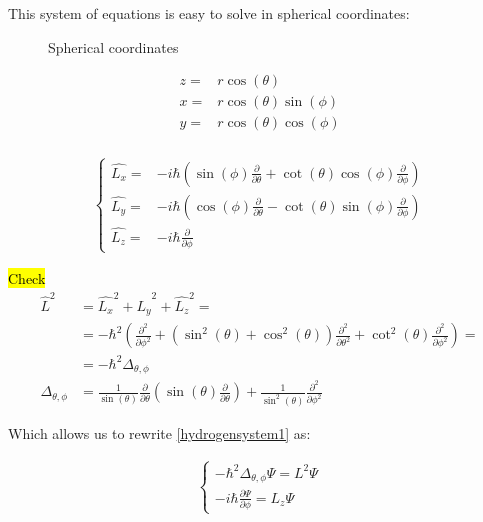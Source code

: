 			This system of equations is easy to solve in spherical coordinates:
			\begin{figure}[!h]
				\centering
				
				\caption{Spherical coordinates}
			\end{figure}
			
			\begin{align}
				z =& r \cos(\theta) \\ 
				x =& r \cos(\theta)\sin(\phi) \\ 
				y =& r \cos(\theta)\cos(\phi) \\ 								
			\end{align}
			
			\begin{align}
				\left\{ \begin{aligned}
					\hat{L_x} =& - i\hbar \left(\sin(\phi)\frac{\partial}{\partial \theta} + \cot(\theta)\cos(\phi)\frac{\partial}{\partial \phi}\right) \\
					\hat{L_y} =& - i\hbar \left(\cos(\phi)\frac{\partial}{\partial \theta} - \cot(\theta)\sin(\phi)\frac{\partial}{\partial \phi}\right) \\
					\hat{L_z} =& - i\hbar \frac{\partial}{\partial \phi}
				\end{aligned} \right.
			\end{align}
			
			\hl{Check}
			\begin{align}
				\hat{L}^2 	&= \hat{L_x}^2 + \hat{L_y}^2 + \hat{L_z}^2 = \\
				&= -\hbar^2 \left( \frac{\partial^2}{\partial \phi^2} + \left(\sin^2(\theta) + \cos^2(\theta) \right)\frac{\partial^2}{\partial \theta^2} + \cot^2(\theta) \frac{\partial^2}{\partial \phi^2} \right) = \\
				&= -\hbar^2 \Delta_{\theta, \phi} \\
				\Delta_{\theta, \phi} &= \frac{1}{\sin (\theta)}\frac{\partial}{\partial \theta}\left(\sin(\theta)\frac{\partial}{\partial \theta}\right) + \frac{1}{\sin^2(\theta)}\frac{\partial^2}{\partial \phi ^2}
			\end{align}
			
			Which allows us to rewrite \ref{hydrogensystem1} as:
			
			\begin{align}
				\left\{ \begin{aligned}
					-\hbar^2 \Delta_{\theta, \phi} \Psi = L^2 \Psi \\
					-i\hbar \frac{\partial \Psi}{\partial \phi} = L_z \Psi
				\end{aligned} \right.				
			\end{align}
			
